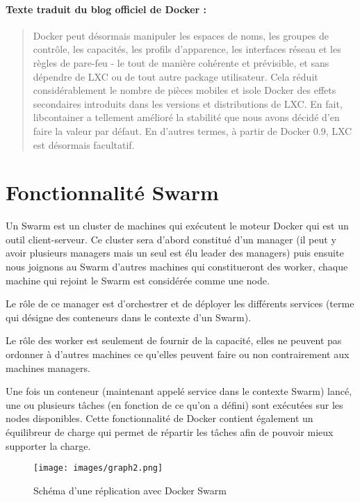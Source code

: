 \documentclass[oneside,12pt]{report}
\begin{document}
\paragraph{Texte traduit du blog officiel de Docker : 
}
\begin{quote}
    Docker peut désormais manipuler les espaces de noms, les groupes de contrôle, les capacités, les profils d'apparence, les interfaces réseau et les règles de pare-feu - le tout de manière cohérente et prévisible, et sans dépendre de LXC ou de tout autre package utilisateur. Cela réduit considérablement le nombre de pièces mobiles et isole Docker des effets secondaires introduits dans les versions et distributions de LXC. En fait, libcontainer a tellement amélioré la stabilité que nous avons décidé d'en faire la valeur par défaut. En d'autres termes, à partir de Docker 0.9, LXC est désormais facultatif.
\end{quote}
    
 
\section{Fonctionnalité Swarm}

Un Swarm est un cluster de machines qui exécutent le moteur Docker qui est un outil client-serveur. Ce cluster sera d'abord constitué d'un manager (il peut y avoir plusieurs managers mais un seul est élu leader des managers) puis ensuite nous joignons au Swarm d'autres machines qui constitueront des worker, chaque machine qui rejoint le Swarm est considérée comme une node.\newline
 
Le rôle de ce manager est d'orchestrer et de déployer les différents services (terme qui désigne des conteneurs dans le contexte d'un Swarm).

Le rôle des worker est seulement de fournir de la capacité, elles ne peuvent pas ordonner à d'autres machines ce qu'elles peuvent faire ou non contrairement aux machines managers. \newline

Une fois un conteneur (maintenant appelé service dans le contexte Swarm) lancé, une ou plusieurs tâches (en fonction de ce qu'on a défini) sont exécutées sur les nodes disponibles. Cette fonctionnalité de Docker contient également un équilibreur de charge qui permet de répartir les tâches afin de pouvoir mieux supporter la charge.

\begin{figure}[H]
    \centering
    \texttt{[image: images/graph2.png]}
    \caption{Schéma d'une réplication avec Docker Swarm}
    \label{fig:mesh1}
\end{figure}
\end{document}
